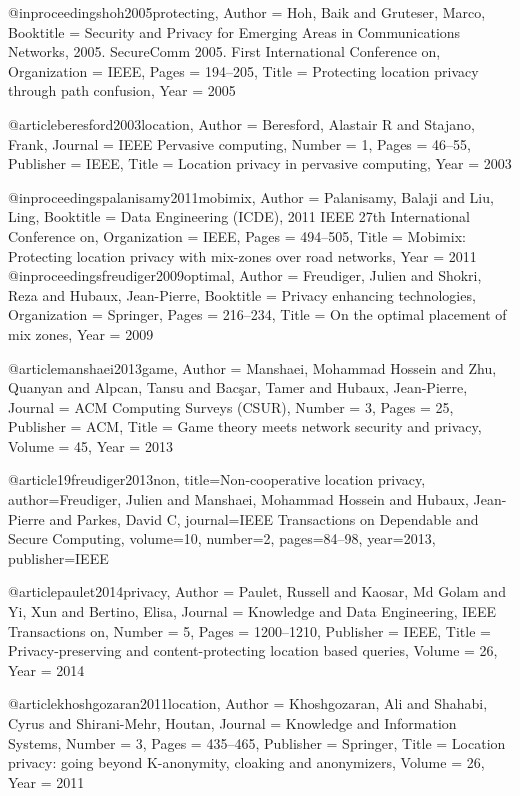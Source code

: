 @inproceedings{hoh2005protecting,
	Author = {Hoh, Baik and Gruteser, Marco},
	Booktitle = {Security and Privacy for Emerging Areas in Communications Networks, 2005. SecureComm 2005. First International Conference on},
	Organization = {IEEE},
	Pages = {194--205},
	Title = {Protecting location privacy through path confusion},
	Year = {2005}}

@article{beresford2003location,
	Author = {Beresford, Alastair R and Stajano, Frank},
	Journal = {IEEE Pervasive computing},
	Number = {1},
	Pages = {46--55},
	Publisher = {IEEE},
	Title = {Location privacy in pervasive computing},
	Year = {2003}}


@inproceedings{palanisamy2011mobimix,
	Author = {Palanisamy, Balaji and Liu, Ling},
	Booktitle = {Data Engineering (ICDE), 2011 IEEE 27th International Conference on},
	Organization = {IEEE},
	Pages = {494--505},
	Title = {Mobimix: Protecting location privacy with mix-zones over road networks},
	Year = {2011}}
@inproceedings{freudiger2009optimal,
	Author = {Freudiger, Julien and Shokri, Reza and Hubaux, Jean-Pierre},
	Booktitle = {Privacy enhancing technologies},
	Organization = {Springer},
	Pages = {216--234},
	Title = {On the optimal placement of mix zones},
	Year = {2009}}

@article{manshaei2013game,
	Author = {Manshaei, Mohammad Hossein and Zhu, Quanyan and Alpcan, Tansu and Bac{\c{s}}ar, Tamer and Hubaux, Jean-Pierre},
	Journal = {ACM Computing Surveys (CSUR)},
	Number = {3},
	Pages = {25},
	Publisher = {ACM},
	Title = {Game theory meets network security and privacy},
	Volume = {45},
	Year = {2013}}

@article{19freudiger2013non,
  title={Non-cooperative location privacy},
  author={Freudiger, Julien and Manshaei, Mohammad Hossein and Hubaux, Jean-Pierre and Parkes, David C},
  journal={IEEE Transactions on Dependable and Secure Computing},
  volume={10},
  number={2},
  pages={84--98},
  year={2013},
  publisher={IEEE}
}


@article{paulet2014privacy,
	Author = {Paulet, Russell and Kaosar, Md Golam and Yi, Xun and Bertino, Elisa},
	Journal = {Knowledge and Data Engineering, IEEE Transactions on},
	Number = {5},
	Pages = {1200--1210},
	Publisher = {IEEE},
	Title = {Privacy-preserving and content-protecting location based queries},
	Volume = {26},
	Year = {2014}}

@article{khoshgozaran2011location,
	Author = {Khoshgozaran, Ali and Shahabi, Cyrus and Shirani-Mehr, Houtan},
	Journal = {Knowledge and Information Systems},
	Number = {3},
	Pages = {435--465},
	Publisher = {Springer},
	Title = {Location privacy: going beyond K-anonymity, cloaking and anonymizers},
	Volume = {26},
	Year = {2011}}

